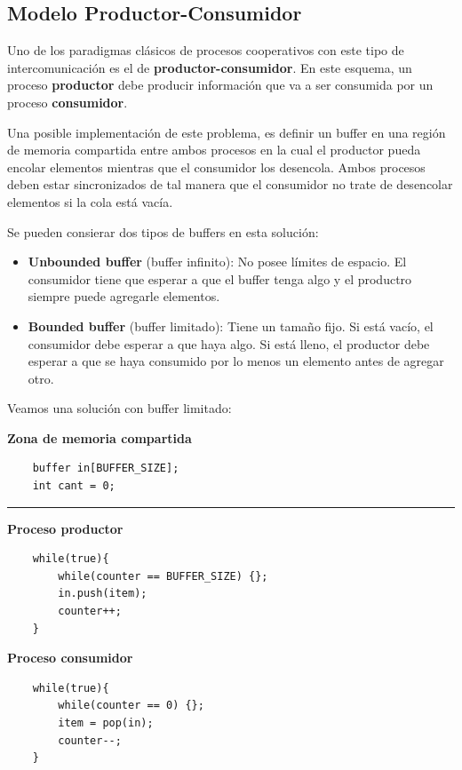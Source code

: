 \subsection{Modelo Productor-Consumidor}
Uno de los paradigmas clásicos de procesos cooperativos con este tipo de intercomunicación es el de \textbf{productor-consumidor}. En este esquema, un proceso \textbf{productor} debe producir información que va a ser consumida por un proceso \textbf{consumidor}.

Una posible implementación de este problema, es definir un buffer en una región de memoria compartida entre ambos procesos en la cual el productor pueda encolar elementos mientras que el consumidor los desencola. Ambos procesos deben estar sincronizados de tal manera que el consumidor no trate de desencolar elementos si la cola está vacía.

Se pueden consierar dos tipos de buffers en esta solución:
\begin{itemize}
    \item \textbf{Unbounded buffer} (buffer infinito): No posee límites de espacio. El consumidor tiene que esperar a que el buffer tenga algo y el productro siempre puede agregarle elementos.
    \item \textbf{Bounded buffer} (buffer limitado): Tiene un tamaño fijo. Si está vacío, el consumidor debe esperar a que haya algo. Si está lleno, el productor debe esperar a que se haya consumido por lo menos un elemento antes de agregar otro.
\end{itemize}

Veamos una solución con buffer limitado:

\vspace*{0.25cm}
\begin{center}
        \textbf{Zona de memoria compartida}
    \begin{verbatim}
    buffer in[BUFFER_SIZE];
    int cant = 0;
    \end{verbatim}
\end{center}
\setlength{\columnseprule}{0.4pt}
\noindent\rule{\textwidth}{0.4pt}
\begin{multicols}{2}
    \begin{center}
    \textbf{Proceso productor}

    \begin{verbatim}
    while(true){
        while(counter == BUFFER_SIZE) {};
        in.push(item);
        counter++;
    }
    \end{verbatim}
\columnbreak
\textbf{Proceso consumidor}
    \begin{verbatim}
    while(true){
        while(counter == 0) {};
        item = pop(in);
        counter--;
    }
    \end{verbatim}
    \end{center}
\end{multicols}
\setlength{\columnseprule}{0pt}

